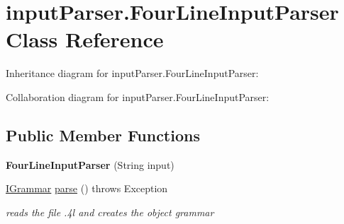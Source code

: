 \hypertarget{classinput_parser_1_1_four_line_input_parser}{\section{input\-Parser.\-Four\-Line\-Input\-Parser Class Reference}
\label{classinput_parser_1_1_four_line_input_parser}
}


Inheritance diagram for input\-Parser.\-Four\-Line\-Input\-Parser\-:


Collaboration diagram for input\-Parser.\-Four\-Line\-Input\-Parser\-:
\subsection*{Public Member Functions}
\begin{DoxyCompactItemize}
\item 
\hypertarget{classinput_parser_1_1_four_line_input_parser_ab60c07b777f5edc493d0d71abcfdc840}{{\bfseries Four\-Line\-Input\-Parser} (String input)}\label{classinput_parser_1_1_four_line_input_parser_ab60c07b777f5edc493d0d71abcfdc840}

\item 
\hyperlink{interfacecontext_free_1_1grammar_1_1_i_grammar}{I\-Grammar} \hyperlink{classinput_parser_1_1_four_line_input_parser_a99c37488d66cfeecb33e13d573b4a81a}{parse} ()  throws Exception
\begin{DoxyCompactList}\small\item\em reads the file .4l and creates the object grammar \end{DoxyCompactList}\end{DoxyCompactItemize}
